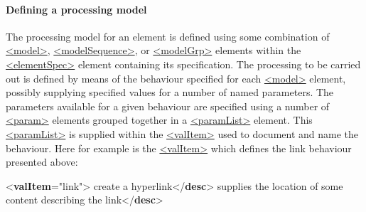 \paragraph[{Defining a processing model}]{Defining a processing model}\label{TDPMDEF}\par
The processing model for an element is defined using some combination of \hyperref[TEI.model]{<model>}, \hyperref[TEI.modelSequence]{<modelSequence>}, or \hyperref[TEI.modelGrp]{<modelGrp>} elements within the \hyperref[TEI.elementSpec]{<elementSpec>} element containing its specification. The processing to be carried out is defined by means of the behaviour specified for each \hyperref[TEI.model]{<model>} element, possibly supplying specified values for a number of named parameters. The parameters available for a given behaviour are specified using a number of \hyperref[TEI.param]{<param>} elements grouped together in a \hyperref[TEI.paramList]{<paramList>} element. This \hyperref[TEI.paramList]{<paramList>} is supplied within the \hyperref[TEI.valItem]{<valItem>} used to document and name the behaviour. Here for example is the \hyperref[TEI.valItem]{<valItem>} which defines the \textsf{link} behaviour presented above: \par\bgroup{}\exampleFont \begin{shaded}\noindent\mbox{}{<\textbf{valItem}\hspace*{1em}{ident}="{link}">}\mbox{}\newline 
{}create a hyperlink{</\textbf{desc}>}\mbox{}\newline 
{}\mbox{}\newline 
\hspace*{1em}\mbox{}\newline 
\hspace*{1em}\hspace*{1em}supplies the location of some content describing the link{</\textbf{desc}>}\mbox{}\newline 

\end{shaded}
